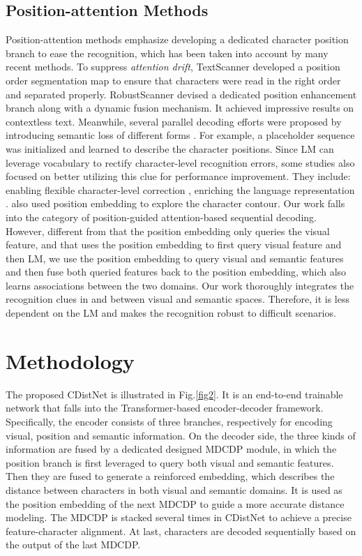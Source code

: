 \subsection{Position-attention Methods}
Position-attention methods emphasize developing a dedicated character position branch to ease the recognition, which has been taken into account by many recent methods. To suppress \emph{attention drift}, TextScanner \citep{wan2020textscanner} developed a position order segmentation map to ensure that characters were read in the right order and separated properly. RobustScanner \citep{yue2020robustscanner} devised a dedicated position enhancement branch along with a dynamic fusion mechanism. It achieved impressive results on contextless text. Meanwhile, several parallel decoding efforts were proposed by introducing semantic loss of different forms \citep{SEEDqiao2020seed, wang2021FTO, ABInet21CVPR}. For example, a placeholder sequence was initialized and learned to describe the character positions. Since LM can leverage vocabulary to rectify character-level recognition errors, some studies also focused on better utilizing this clue for performance improvement. They include: enabling flexible character-level correction \citep{da2022levenocr}, enriching the language representation \citep{wang2022petr,bautista2022parseq,wang2022mgp,he2021S-GTR}. \citep{xie2022wordart} also used position embedding to explore the character contour. Our work falls into the category of position-guided attention-based sequential decoding. However, different from \citep{yue2020robustscanner} that the position embedding only queries the visual feature, and \citep{ABInet21CVPR} that uses the position embedding to first query visual feature and then LM, we use the position embedding to query visual and semantic features and then fuse both queried features back to the position embedding, which also learns associations between the two domains. Our work thoroughly integrates the recognition clues in and between visual and semantic spaces. Therefore, it is less dependent on the LM and makes the recognition robust to difficult scenarios.

\section{Methodology}
The proposed CDistNet is illustrated in Fig.\ref{fig2}. It is an end-to-end trainable network that falls into the Transformer-based encoder-decoder framework. Specifically, the encoder consists of three branches, respectively for encoding visual, position and semantic information. On the decoder side, the three kinds of information are fused by a dedicated designed MDCDP module, in which the position branch is first leveraged to query both visual and semantic features. Then they are fused to generate a reinforced embedding, which describes the distance between characters in both visual and semantic domains. It is used as the position embedding of the next MDCDP to guide a more accurate distance modeling. The MDCDP is stacked several times in CDistNet to achieve a precise feature-character alignment. At last, characters are decoded sequentially based on the output of the last MDCDP.     

